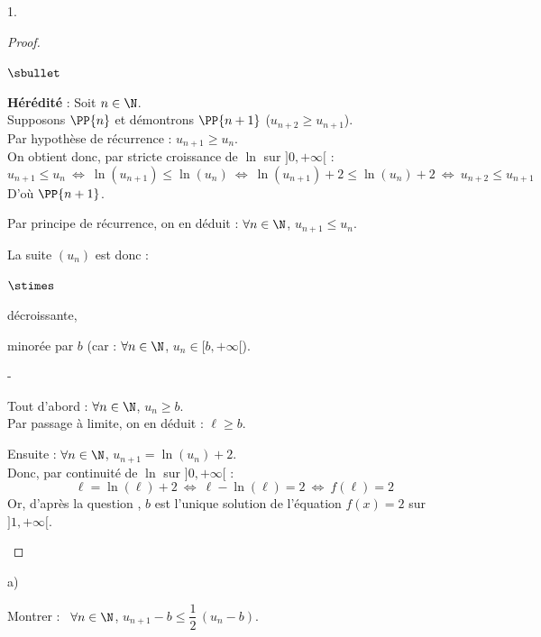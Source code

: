 \begin{noliste}{1.}
\begin{proof}
\begin{noliste}{$\sbullet$}
\begin{remark}
\begin{noliste}{\fitem}
	\item {\bf Hérédité} : Soit $n\in\N$.\\
	Supposons $\PP{n}$ et démontrons $\PP{n+1}$ (\ie $u_{n+2} 
	\geq u_{n+1}$).\\
	Par hypothèse de récurrence : $u_{n+1} \geq u_n$.\\
	On obtient donc, par stricte croissance de $\ln$ sur 
	$]0,+\infty[$ :
	\[
	  u_{n+1} \leq u_n \ \Leftrightarrow \ \ln(u_{n+1}) \leq 
	  \ln(u_n) 
	  \ \Leftrightarrow \ \ln(u_{n+1}) +2 \leq \ln(u_n)+2
	  \ \Leftrightarrow \ u_{n+2} \leq u_{n+1}
	\]
	D'où $\PP{n+1}$.
      \end{noliste}
      Par principe de récurrence, on en déduit : $\forall n \in \N$, 
      $u_{n+1} \leq u_n$.
      \end{remark}

      
      \item La suite $(u_n)$ est donc :
      \begin{noliste}{$\stimes$}
	\item décroissante,
	\item minorée par $b$ (car : $\forall n \in \N$, $u_n \in 
	[b,+\infty[$).
      \end{noliste}
      
      \item 
      \begin{noliste}{-}
	\item Tout d'abord : $\forall n\in \N$, $u_n \geq b$.\\
	Par passage à limite, on en déduit : $\ell \geq b$.
	
	\item Ensuite : $\forall n\in \N$, $u_{n+1} = \ln(u_n) +2$.\\
	Donc, par continuité de $\ln$ sur $]0,+\infty[$ :
	\[
	  \ell = \ln(\ell) +2 \ \Leftrightarrow \ \ell - \ln(\ell) =2
	  \ \Leftrightarrow \ f(\ell)=2
	\]
	Or, d'après la question , $b$ est l'unique solution 
	de l'équation $f(x)=2$ sur $]1,+\infty[$.
	~\\[-1.4cm]
      \end{noliste}
     \end{noliste}
    \end{proof}
  
  \item 
  \begin{noliste}{a)}
    \setlength{\itemsep}{2mm}
  \item Montrer : \ $\forall n \in \N$, $ u_{n+1}-b \leq \dfrac{1}{2}
    \, (u_n-b)$.
    

\end{noliste}
\end{noliste}
